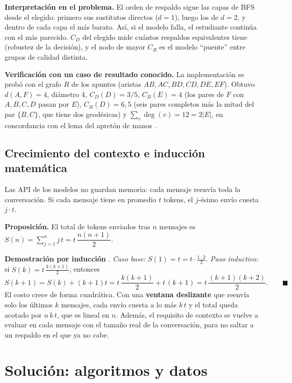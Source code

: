 \documentclass[12pt,letterpaper]{article}
\begin{document}
\textbf{Interpretación en el problema.} El orden de respaldo sigue las capas de BFS desde el elegido: primero sus sustitutos directos ($d=1$), luego los de $d=2$, y dentro de cada capa el más barato. Así, si el modelo falla, el estudiante continúa con el más parecido. $C_D$ del elegido mide cuántos respaldos equivalentes tiene (robustez de la decisión), y el nodo de mayor $C_B$ es el modelo \enquote{puente} entre grupos de calidad distinta.

\textbf{Verificación con un caso de resultado conocido.} La implementación se probó con el grafo $R$ de los apuntes (aristas $AB, AC, BD, CD, DE, EF$). Obtuvo $d(A,F)=4$, diámetro 4, $C_D(D)=3/5$, $C_B(E)=4$ (los pares de $F$ con $A,B,C,D$ pasan por $E$), $C_B(D)=6{,}5$ (seis pares completos más la mitad del par $\{B,C\}$, que tiene dos geodésicas) y $\sum_v\deg(v)=12=2|E|$, en concordancia con el lema del apretón de manos \parencite{zuleta2026discretas}.

\subsection{Crecimiento del contexto e inducción matemática}
Las API de los modelos no guardan memoria: cada mensaje reenvía toda la conversación. Si cada mensaje tiene en promedio $t$ tokens, el $j$-ésimo envío cuesta $j\cdot t$.

\textbf{Proposición.} El total de tokens enviados tras $n$ mensajes es $S(n)=\sum_{j=1}^{n} j\,t = t\,\dfrac{n(n+1)}{2}$.

\textbf{Demostración por inducción} \parencite{zuleta2026discretas}. \emph{Caso base:} $S(1)=t=t\cdot\frac{1\cdot 2}{2}$. \emph{Paso inductivo:} si $S(k)=t\,\frac{k(k+1)}{2}$, entonces
\[
S(k+1)=S(k)+(k+1)t=t\,\frac{k(k+1)}{2}+t\,(k+1)=t\,\frac{(k+1)(k+2)}{2}.\qquad\blacksquare
\]
El costo crece de forma cuadrática. Con una \textbf{ventana deslizante} que reenvía solo los últimos $k$ mensajes, cada envío cuesta a lo más $k\,t$ y el total queda acotado por $n\,k\,t$, que es lineal en $n$. Además, el requisito de contexto se vuelve a evaluar en cada mensaje con el tamaño real de la conversación, para no saltar a un respaldo en el que ya no cabe.

\section{Solución: algoritmos y datos}
\end{document}
